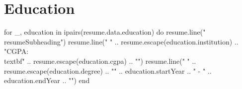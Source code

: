 \section{\textbf{Education}}
\resumeSubHeadingListStart
\begin{luacode*}
for _, education in ipairs(resume.data.education) do
  resume.line("\\resumeSubheading")
  resume.line("  {" .. resume.escape(education.institution) .. "}{CGPA: \\textbf{" .. resume.escape(education.cgpa) .. "}}")
  resume.line("  {" .. resume.escape(education.degree) .. "}{" .. education.startYear .. " - " .. education.endYear .. "}")
end
\end{luacode*}
\resumeSubHeadingListEnd
\vspace{-1mm}
